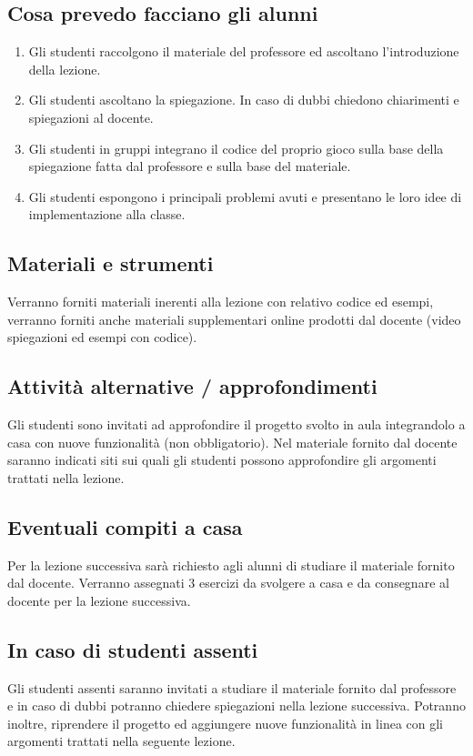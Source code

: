 \documentclass[12pt,a4paper]{article}
\begin{document}
\subsection*{Cosa prevedo facciano gli alunni}

\begin{enumerate}

\item Gli studenti raccolgono il materiale del professore ed ascoltano l’introduzione della lezione.
\item Gli studenti ascoltano la spiegazione. In caso di dubbi chiedono chiarimenti e spiegazioni al docente.
\item Gli studenti in gruppi integrano il codice del proprio gioco sulla base della spiegazione fatta dal professore e sulla base del materiale.
\item Gli studenti espongono i principali problemi avuti e presentano le loro idee di implementazione alla classe.

\end{enumerate}

\subsection*{Materiali e strumenti}
Verranno forniti materiali inerenti alla lezione con relativo codice ed esempi, verranno forniti anche materiali supplementari online prodotti dal docente (video spiegazioni ed esempi con codice).


\subsection*{Attività alternative / approfondimenti}
Gli studenti sono invitati ad approfondire il progetto svolto in aula integrandolo a casa con nuove funzionalità (non obbligatorio). Nel materiale fornito dal docente saranno indicati siti sui quali gli studenti possono approfondire gli argomenti trattati nella lezione.


\subsection*{Eventuali compiti a casa}
Per la lezione successiva sarà richiesto agli alunni di studiare il materiale fornito dal docente. Verranno assegnati 3 esercizi da svolgere a casa e da consegnare al docente per la lezione successiva. 


\subsection*{In caso di studenti assenti}
Gli studenti assenti saranno invitati a studiare il materiale fornito dal professore e in caso di dubbi potranno chiedere spiegazioni nella lezione successiva.  Potranno inoltre, riprendere il progetto ed aggiungere nuove funzionalità in linea con gli argomenti trattati nella seguente lezione.
\end{document}
